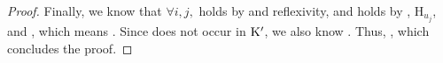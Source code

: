 \begin{proof}
    Finally, we know that $\forall i,j,$  holds by
     and reflexivity, and  holds
    by , H$_{u_j}$, and ,
    which means \vldinenv{\AEnv}{\CSet_{\va}}{\substvars_{\va}}.
    Since \va does not occur in $\mathrm{K}'$, we also know 
    .
    Thus, \vldinenv{\AEnv}{\CSet}{\substvars_{\va}}, which concludes the proof.
\end{proof}

